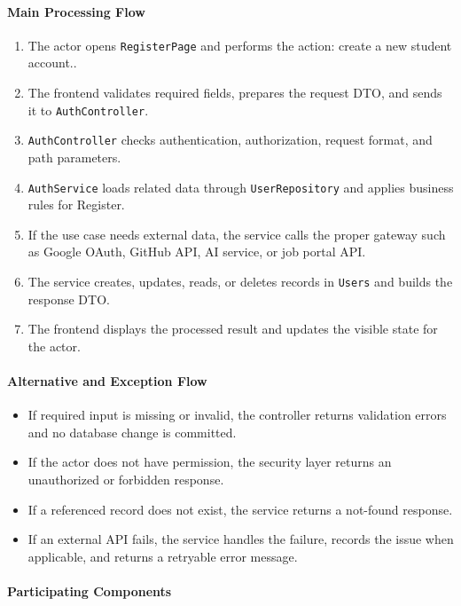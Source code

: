 \paragraph{Main Processing Flow}

\begin{enumerate}
    \item The actor opens \texttt{RegisterPage} and performs the action: create a new student account..
    \item The frontend validates required fields, prepares the request DTO, and sends it to \texttt{AuthController}.
    \item \texttt{AuthController} checks authentication, authorization, request format, and path parameters.
    \item \texttt{AuthService} loads related data through \texttt{UserRepository} and applies business rules for Register.
    \item If the use case needs external data, the service calls the proper gateway such as Google OAuth, GitHub API, AI service, or job portal API.
    \item The service creates, updates, reads, or deletes records in \texttt{Users} and builds the response DTO.
    \item The frontend displays the processed result and updates the visible state for the actor.
\end{enumerate}

\paragraph{Alternative and Exception Flow}

\begin{itemize}
    \item If required input is missing or invalid, the controller returns validation errors and no database change is committed.
    \item If the actor does not have permission, the security layer returns an unauthorized or forbidden response.
    \item If a referenced record does not exist, the service returns a not-found response.
    \item If an external API fails, the service handles the failure, records the issue when applicable, and returns a retryable error message.
\end{itemize}

\paragraph{Participating Components}

